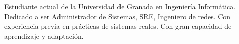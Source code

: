 

\begin{cvparagraph}

Estudiante actual de la Universidad de Granada en Ingeniería Informática. Dedicado a ser Administrador de Sistemas, SRE, Ingeniero de redes. Con experiencia
previa en prácticas de sistemas reales. Con gran capacidad de aprendizaje y adaptación.
\end{cvparagraph}